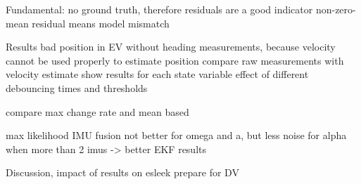 Fundamental: no ground truth, therefore residuals are a good indicator
non-zero-mean residual means model mismatch~\cite[p.~158]{AlexanderWischnewski.2019}

Results
bad position in EV without heading measurements, because velocity cannot be used properly to estimate position
compare raw measurements with velocity estimate
show results for each state variable
effect of different debouncing times and thresholds

compare max change rate and mean based

max likelihood IMU fusion not better for omega and a, but less noise for alpha when more than 2 imus -> better EKF results


Discussion, impact of results on esleek
prepare for DV
